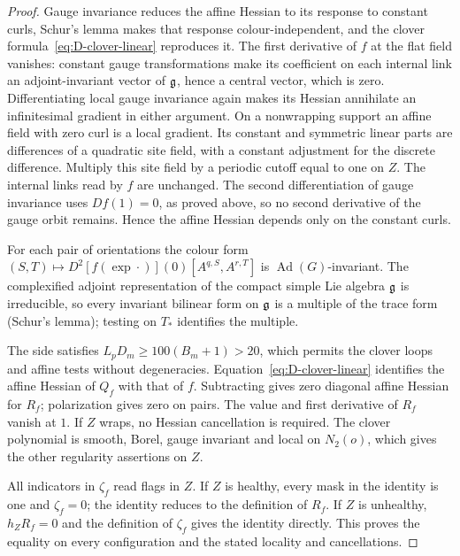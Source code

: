 \begin{proof}
Gauge invariance reduces the affine Hessian to its response to constant curls, Schur's lemma makes that response colour-independent, and the clover formula~\eqref{eq:D-clover-linear} reproduces it. The first derivative of $f$ at the flat field vanishes: constant gauge transformations make its coefficient on each internal link an adjoint-invariant vector of $\mathfrak{g}$, hence a central vector, which is zero. Differentiating local gauge invariance again makes its Hessian annihilate an infinitesimal gradient in either argument. On a nonwrapping support an affine field with zero curl is a local gradient. Its constant and symmetric linear parts are differences of a quadratic site field, with a constant adjustment for the discrete difference. Multiply this site field by a periodic cutoff equal to one on $Z$. The internal links read by $f$ are unchanged. The second differentiation of gauge invariance uses $Df(1)=0$, as proved above, so no second derivative of the gauge orbit remains. Hence the affine Hessian depends only on the constant curls.

For each pair of orientations the colour form $(S,T)\mapsto D^2[f(\exp\cdot)](0)[A^{q,S},A^{r,T}]$ is $\operatorname{Ad}(G)$-invariant. The complexified adjoint representation of the compact simple Lie algebra $\mathfrak{g}$ is irreducible, so every invariant bilinear form on $\mathfrak{g}$ is a multiple of the trace form (Schur's lemma); testing on $T_*$ identifies the multiple.

The side satisfies $L_pD_m\ge100(B_m+1)>20$, which permits the clover loops and affine tests without degeneracies. Equation~\eqref{eq:D-clover-linear} identifies the affine Hessian of $Q_f$ with that of $f$. Subtracting gives zero diagonal affine Hessian for $R_f$; polarization gives zero on pairs. The value and first derivative of $R_f$ vanish at $1$. If $Z$ wraps, no Hessian cancellation is required. The clover polynomial is smooth, Borel, gauge invariant and local on $N_2(o)$, which gives the other regularity assertions on $Z$.

All indicators in $\zeta_f$ read flags in $Z$. If $Z$ is healthy, every mask in the identity is one and $\zeta_f=0$; the identity reduces to the definition of $R_f$. If $Z$ is unhealthy, $h_ZR_f=0$ and the definition of $\zeta_f$ gives the identity directly. This proves the equality on every configuration and the stated locality and cancellations.
\end{proof}

